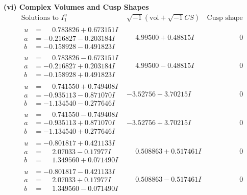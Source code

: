 \documentclass[1p]{elsarticle_modified}
\theoremstyle{definition}
\newcommand{\I}{\sqrt{-1}}
\begin{document}
\newpage\flushleft \textbf{(vi) Complex Volumes and Cusp Shapes}
$$\begin{array}{c|c|c}  
\text{Solutions to }I^u_{1}& \I (\text{vol} + \sqrt{-1}CS) & \text{Cusp shape}\\
 \hline 
\begin{aligned}
u &= \phantom{-}0.783826 + 0.673151 I \\
a &= -0.216827 - 0.203184 I \\
b &= -0.158928 - 0.491823 I\end{aligned}
 & \phantom{-}4.99500 + 0.48815 I & \phantom{-0.000000 } 0 \\ \hline\begin{aligned}
u &= \phantom{-}0.783826 - 0.673151 I \\
a &= -0.216827 + 0.203184 I \\
b &= -0.158928 + 0.491823 I\end{aligned}
 & \phantom{-}4.99500 - 0.48815 I & \phantom{-0.000000 } 0 \\ \hline\begin{aligned}
u &= \phantom{-}0.741550 + 0.749408 I \\
a &= -0.935113 - 0.871070 I \\
b &= -1.134540 - 0.277646 I\end{aligned}
 & -3.52756 - 3.70215 I & \phantom{-0.000000 } 0 \\ \hline\begin{aligned}
u &= \phantom{-}0.741550 - 0.749408 I \\
a &= -0.935113 + 0.871070 I \\
b &= -1.134540 + 0.277646 I\end{aligned}
 & -3.52756 + 3.70215 I & \phantom{-0.000000 } 0 \\ \hline\begin{aligned}
u &= -0.801817 + 0.421133 I \\
a &= \phantom{-}2.07033 - 0.17977 I \\
b &= \phantom{-}1.349560 + 0.071490 I\end{aligned}
 & \phantom{-}0.508863 + 0.517461 I & \phantom{-0.000000 } 0 \\ \hline\begin{aligned}
u &= -0.801817 - 0.421133 I \\
a &= \phantom{-}2.07033 + 0.17977 I \\
b &= \phantom{-}1.349560 - 0.071490 I\end{aligned}
 & \phantom{-}0.508863 - 0.517461 I & \phantom{-0.000000 } 0 \\ \hline\begin{aligned}

\end{aligned}
\end{array}$$
\end{document}
